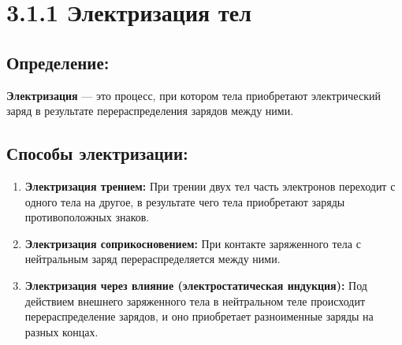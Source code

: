 \documentclass[a4paper,12pt]{article}
\begin{document}
\begin{center}
\end{center}

\vspace{-2.5em}








\section*{3.1.1 Электризация тел}
\vspace{-9pt}
\subsection*{Определение:}
\vspace{-3pt}
\textbf{Электризация} — это процесс, при котором тела приобретают электрический заряд в результате перераспределения зарядов между ними.

\vspace{-9pt}
\subsection*{Способы электризации:}
\vspace{-3pt}
\begin{enumerate}[itemsep=0pt, topsep=0pt, parsep=3pt]
    \item \textbf{Электризация трением:} При трении двух тел часть электронов переходит с одного тела на другое, в результате чего тела приобретают заряды противоположных знаков.
    \item \textbf{Электризация соприкосновением:} При контакте заряженного тела с нейтральным заряд перераспределяется между ними.
    \item \textbf{Электризация через влияние (электростатическая индукция):} Под действием внешнего заряженного тела в нейтральном теле происходит перераспределение зарядов, и оно приобретает разноименные заряды на разных концах.
\end{enumerate}
\end{document}
